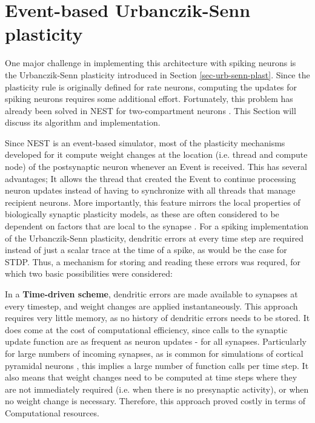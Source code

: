 \section{Event-based Urbanczik-Senn plasticity}\label{sec-event-urb}

One major challenge in implementing this architecture with spiking neurons is the Urbanczik-Senn plasticity introduced
in Section \ref{sec-urb-senn-plast}. Since the plasticity rule is originally defined for rate neurons, computing the
updates for spiking neurons requires some additional effort. Fortunately, this problem has already been solved in NEST
for two-compartment neurons \citep{Stapmanns2021}. This Section will discuss its algorithm and implementation. \newline

Since NEST is an event-based simulator, most of the plasticity mechanisms developed for it compute weight changes at the
location (i.e. thread and compute node) of the postsynaptic neuron whenever an Event is received. This has several
advantages; It allows the thread that created the Event to continue processing neuron updates instead of having to
synchronize with all threads that manage recipient neurons.  More importantly, this feature mirrors the local properties
of biologically synaptic plasticity models, as these are often considered to be dependent on factors that are local to
the synapse \citeme. For a spiking implementation of the Urbanczik-Senn plasticity, dendritic errors at every time step
are required instead of just a scalar trace at the time of a spike, as would be the case for STDP. Thus, a mechanism for
storing and reading these errors was requred, for which two basic possibilities were considered:

In a \textbf{Time-driven scheme}, dendritic errors are made available to synapses at every timestep, and weight changes
are applied instantaneously. This approach requires very little memory, as no history of dendritic errors needs to be
stored. It does come at the cost of computational efficiency, since calls to the synaptic update function are as
frequent as neuron updates - for all synapses. Particularly for large numbers of incoming synapses, as is common for
simulations of cortical pyramidal neurons \citep{potjans2014cell,vezoli2004quantitative}, this implies a large number of
function calls per time step. It also means that weight changes need to be computed at time steps where they are not
immediately required (i.e. when there is no presynaptic activity), or when no weight change is necessary. Therefore,
this approach proved costly in terms of Computational resources.

